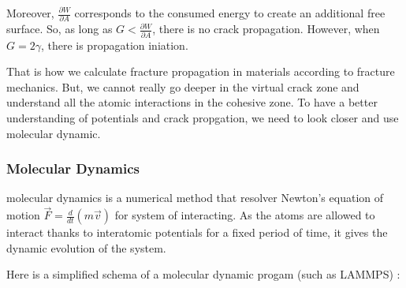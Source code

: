             Moreover, $\frac{\partial W}{\partial A}$ corresponds to the consumed energy to create an additional free surface. So, as long as $G < \frac{\partial W}{\partial A}$, there is no crack propagation. However, when $G = 2\gamma$, there is propagation iniation.\medskip

            That is how we calculate fracture propagation in materials according to fracture mechanics. But, we cannot really go deeper in the virtual crack zone and understand all the atomic interactions in the \gls{cohesive zone}. To have a better understanding of potentials and crack propgation, we need to look closer and use \gls{molecular dynamic}.
        
        \subsubsection{Molecular Dynamics}
            
            \Glspl{molecular dynamic} is a numerical method that resolver Newton's equation of motion $\vec{F} = \frac{d}{dt}(m\vec{v})$ for system of interacting. As the atoms are allowed to interact thanks to interatomic potentials for a fixed period of time, it gives the dynamic evolution of the system. \medskip

            Here is a simplified schema of a \gls{molecular dynamic} progam (such as LAMMPS) : 

            \begin{center}
                \captionsetup{type=figure}
            \end{center}

